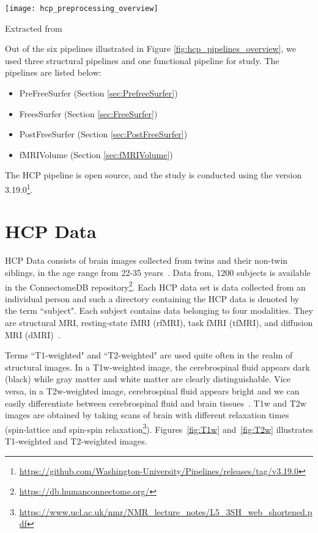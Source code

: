 \begin{center}
   \texttt{[image: hcp\_preprocessing\_overview]}
   \label{fig:hcp_pipelines_overview}
   \caption*{Extracted from \cite{Gla13}}
\end{center}

Out of the six pipelines illustrated in Figure \ref{fig:hcp_pipelines_overview}, we used three structural pipelines and one functional pipeline for study. The pipelines are listed below:
\begin{itemize}
  \item PreFreeSurfer (Section \ref{sec:PrefreeSurfer})
  \item FreesSurfer   (Section \ref{sec:FreeSurfer})
  \item PostFreeSurfer (Section \ref{sec:PostFreeSurfer})
  \item fMRIVolume    (Section \ref{sec:fMRIVolume})
\end{itemize}

The HCP pipeline is open source, and the study is conducted using the version 3.19.0\footnote{\url{https://github.com/Washington-University/Pipelines/releases/tag/v3.19.0}}.

\section{HCP Data} \label{HCP_Data}
HCP Data consists of brain images collected from twins and their non-twin siblings, in the age range from 22-35 years~\cite{HCPData}. Data from, 1200 subjects is available in the ConnectomeDB repository\footnote{\url{https://db.humanconnectome.org/}}. Each HCP data set is data collected from an individual person and such a directory containing the HCP data is denoted by the term ``subject". Each subject contains data belonging to four modalities. They are structural MRI, resting-state fMRI (rfMRI), task fMRI (tfMRI), and diffusion MRI (dMRI)~\cite{HCPData}.

Terms ``T1-weighted" and ``T2-weighted" are used quite often in the realm of structural images. In a T1w-weighted image, the cerebrospinal fluid appears dark (black) while gray matter and white matter are clearly distinguishable. Vice versa, in a T2w-weighted image, cerebrospinal fluid appears bright and we can easily differentiate between cerebrospinal fluid and brain tissues~\cite{t1w_t2w}. T1w and T2w images are obtained by taking scans of brain with different relaxation times (spin-lattice and spin-spin relaxation\footnote{\url{https://www.ucl.ac.uk/nmr/NMR_lecture_notes/L5_3SH_web_shortened.pdf}}).
Figures~\ref{fig:T1w} and~\ref{fig:T2w} illustrates T1-weighted and T2-weighted images.

